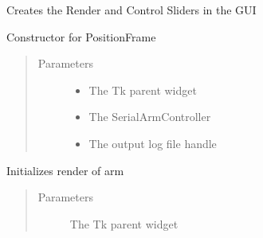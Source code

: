 \documentclass[letterpaper,10pt,english,openany,oneside]{sphinxmanual}
\begin{document}
\begin{fulllineitems}
\label{\detokenize{src/positionframe:PositionFrame.PositionFrame}}
Creates the Render and Control Sliders in the GUI

\begin{fulllineitems}
\label{\detokenize{src/positionframe:PositionFrame.PositionFrame.__init__}}
Constructor for PositionFrame
\begin{quote}\begin{description}
\item[{Parameters}] \leavevmode\begin{itemize}
\item {} 
 \textendash{} The Tk parent widget

\item {} 
 \textendash{} The SerialArmController

\item {} 
 \textendash{} The output log file handle

\end{itemize}

\end{description}\end{quote}

\end{fulllineitems}


\begin{fulllineitems}
\label{\detokenize{src/positionframe:PositionFrame.PositionFrame.create_render}}
Initializes render of arm
\begin{quote}\begin{description}
\item[{Parameters}] \leavevmode
{} \textendash{} The Tk parent widget


\end{description}
\end{quote}
\end{fulllineitems}
\end{fulllineitems}
\end{document}
